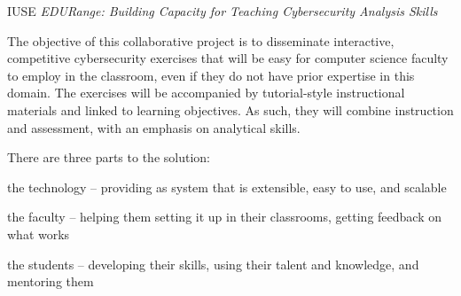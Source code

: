 \documentclass[11pt]{report}
\begin{document}
\begin{center} 
{\Large IUSE {\em EDURange: Building Capacity for Teaching Cybersecurity Analysis Skills}}
\end{center}

The objective of this collaborative project is to disseminate interactive, competitive 
cybersecurity exercises that will be easy for computer science faculty to employ in the 
classroom, even if they do not have prior expertise in this domain.  The exercises 
will be accompanied by tutorial-style instructional materials and linked to learning objectives. 
As such, they will combine instruction and assessment, with an emphasis on
analytical skills.

There are three parts to the solution: 
\begin{packenum}
\item the technology -- providing as system that is extensible, easy to use, and scalable
\item the faculty -- helping them setting it up in their classrooms, getting feedback on what works
\item the students -- developing their skills, using their talent and knowledge, and mentoring them
\end{packenum}

\end{document}
